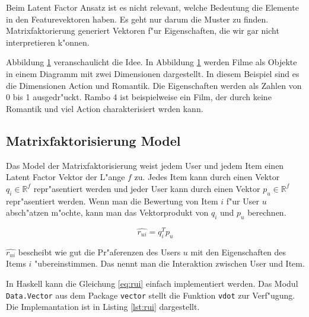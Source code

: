 \documentclass[a4paper, 12pt]{article}
\begin{document}
Beim Latent Factor Ansatz ist es nicht relevant, welche Bedeutung die Elemente in den Featurevektoren haben. Es geht nur darum die Muster zu finden. Matrixfaktorierung generiert Vektoren f"ur Eigenschaften, die wir gar nicht interpretieren k"onnen.

Abbildung \ref{fig:moviedimension} veranschaulicht die Idee. In Abbildung \ref{fig:moviedimension} werden Filme als Objekte in einem Diagramm mit zwei Dimensionen dargestellt. In diesem Beispiel sind es die Dimensionen Action und Romantik. Die Eigenschaften werden als Zahlen von 0 bis 1 ausgedr"uckt. Rambo 4 ist beispielweise ein Film, der durch keine Romantik und viel Action charakterisiert wrden kann.

\begin{figure}
\centering
{}
\label{fig:moviedimension}
\end{figure}


\subsection{Matrixfaktorisierung Model}
\label{sec:matrixfactorizationmodel}

Das Model der Matrixfaktorisierung weist jedem User und jedem Item einen Latent Factor Vektor der L"ange $f$ zu. Jedes Item kann durch einen Vektor $q_i \in \mathbb{R}^f$ repr"asentiert werden und jeder User kann durch einen Vektor $p_u \in \mathbb{R}^f$ repr"asentiert werden. Wenn man die Bewertung von Item $i$ f"ur User $u$ absch"atzen m"ochte, kann man das Vektorprodukt von $q_i$ und $p_u$ berechnen.

\begin{equation}
  \label{eq:rui}
  \hat{r_{ui}} = q_i^T p_u
\end{equation}

$\hat{r_{ui}}$ bescheibt wie gut die Pr"aferenzen des Users $u$ mit den Eigenschaften des Items $i$ "ubereinstimmen. Das nennt man die Interaktion zwischen User und Item.

In Haskell kann die Gleichung \ref{eq:rui} einfach implementiert werden. Das Modul \verb|Data.Vector| aus dem Package \verb|vector| stellt die Funktion \verb|vdot| zur Verf"ugung. Die Implemantation ist in Listing \ref{lst:rui} dargestellt.
\end{document}

